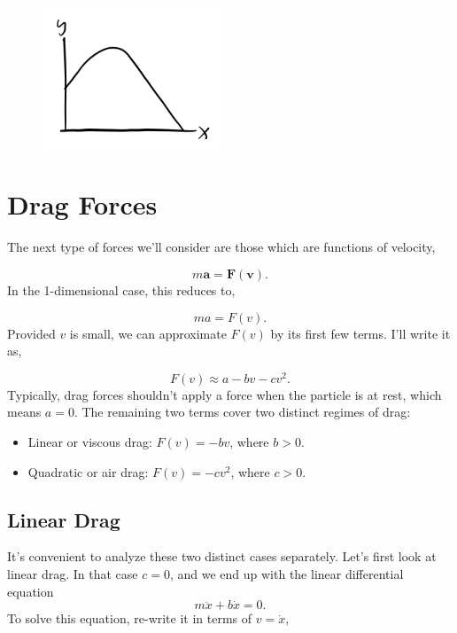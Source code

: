 \documentclass[
  letterpaper,
  DIV=11,
  numbers=noendperiod]{scrreprt}
\providecommand{\tightlist}{%
  \setlength{\itemsep}{0pt}\setlength{\parskip}{0pt}}\usepackage{longtable,booktabs,array}
\begin{document}
\begin{figure}

{\centering \includegraphics[width=2.08333in,height=\textheight]{classical-mechanics/./resources/image-20230214035909918.png}

}

\end{figure}

\hypertarget{drag-forces}{%
\section{Drag Forces}\label{drag-forces}}

The next type of forces we'll consider are those which are functions of
velocity,

\[
m\mathbf{a} = \mathbf{F}(\mathbf{v}).
\] In the 1-dimensional case, this reduces to,

\[
ma = F(v).
\] Provided \(v\) is small, we can approximate \(F(v)\) by its first few
terms. I'll write it as,

\[
F(v) \approx a - bv - cv^2.
\] Typically, drag forces shouldn't apply a force when the particle is
at rest, which means \(a=0\). The remaining two terms cover two distinct
regimes of drag:

\begin{itemize}
\tightlist
\item
  Linear or viscous drag: \(F(v) = -bv\), where \(b > 0\).
\item
  Quadratic or air drag: \(F(v) = -cv^2\), where \(c > 0\).
\end{itemize}

\hypertarget{linear-drag}{%
\subsection{Linear Drag}\label{linear-drag}}

It's convenient to analyze these two distinct cases separately. Let's
first look at linear drag. In that case \(c=0\), and we end up with the
linear differential equation \[
m \ddot x + b \dot x = 0.
\] To solve this equation, re-write it in terms of \(v = \dot x\),
\end{document}

